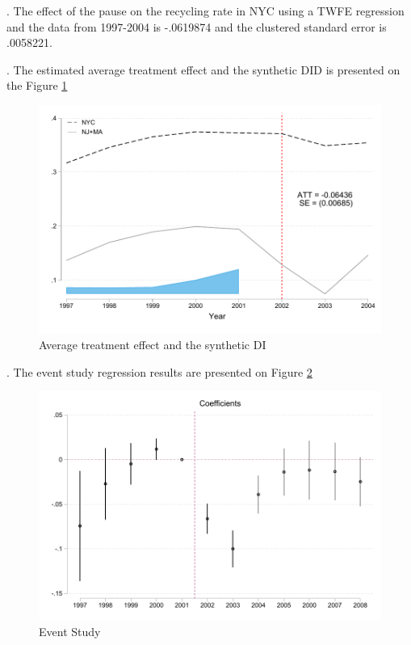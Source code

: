 \documentclass{article}
\begin{document}
\clearpage

. The effect of the pause on the recycling rate in NYC using a TWFE regression and the data
from 1997-2004 is  -.0619874 and the clustered standard error is  .0058221.


. The estimated average treatment effect and the synthetic DID is presented on the Figure \ref{fig:sdid}

\begin{figure}[h!]
    \centering
    \includegraphics{homework 9/output/figure/sdid.pdf}
    \caption{Average treatment effect and the synthetic DI}
    \label{fig:sdid}
\end{figure}

\clearpage

.  The event study regression results are presented on Figure \ref{fig:ES} 

\begin{figure}[h!]
    \centering
    \includegraphics{homework 9/output/figure/eventstudy.pdf}
    \caption{Event Study}
    \label{fig:ES}
\end{figure}
\end{document}
